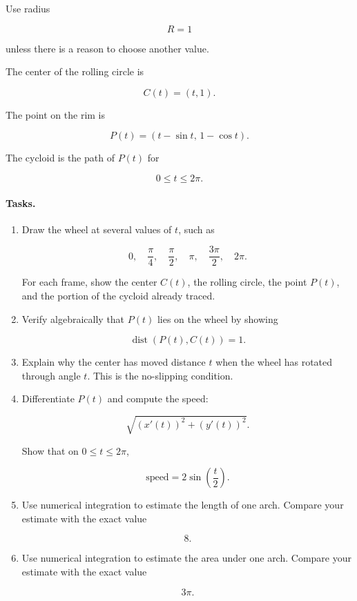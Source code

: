 Use radius

\[
R=1
\]

unless there is a reason to choose another value.

The center of the rolling circle is

\[
C(t)=(t,1).
\]

The point on the rim is

\[
P(t)=(t-\sin t,\,1-\cos t).
\]

The cycloid is the path of \(P(t)\) for

\[
0\le t\le2\pi.
\]

\paragraph{Tasks.}

\begin{enumerate}
\item Draw the wheel at several values of \(t\), such as

\[
0,\quad \frac{\pi}{4},\quad \frac{\pi}{2},\quad \pi,\quad \frac{3\pi}{2},\quad 2\pi.
\]

For each frame, show the center \(C(t)\), the rolling circle, the point \(P(t)\), and the
portion of the cycloid already traced.

\item Verify algebraically that \(P(t)\) lies on the wheel by showing

\[
\operatorname{dist}(P(t),C(t))=1.
\]

\item Explain why the center has moved distance \(t\) when the wheel has rotated through
angle \(t\).  This is the no-slipping condition.

\item Differentiate \(P(t)\) and compute the speed:

\[
\sqrt{(x'(t))^2+(y'(t))^2}.
\]

Show that on \(0\le t\le2\pi\),

\[
\text{speed}=2\sin\left(\frac t2\right).
\]

\item Use numerical integration to estimate the length of one arch.  Compare your estimate
with the exact value

\[
8.
\]

\item Use numerical integration to estimate the area under one arch.  Compare your
estimate with the exact value

\[
3\pi.
\]
\end{enumerate}

